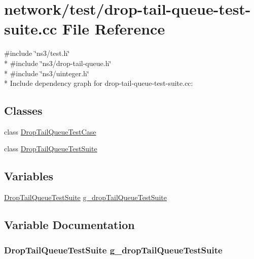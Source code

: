 \hypertarget{drop-tail-queue-test-suite_8cc}{}\section{network/test/drop-\/tail-\/queue-\/test-\/suite.cc File Reference}
\label{drop-tail-queue-test-suite_8cc}
{\ttfamily \#include \char`\"{}ns3/test.\+h\char`\"{}}\\*
{\ttfamily \#include \char`\"{}ns3/drop-\/tail-\/queue.\+h\char`\"{}}\\*
{\ttfamily \#include \char`\"{}ns3/uinteger.\+h\char`\"{}}\\*
Include dependency graph for drop-\/tail-\/queue-\/test-\/suite.cc\+:
\subsection*{Classes}
\begin{DoxyCompactItemize}
\item 
class \hyperlink{classDropTailQueueTestCase}{Drop\+Tail\+Queue\+Test\+Case}
\item 
class \hyperlink{classDropTailQueueTestSuite}{Drop\+Tail\+Queue\+Test\+Suite}
\end{DoxyCompactItemize}
\subsection*{Variables}
\begin{DoxyCompactItemize}
\item 
\hyperlink{classDropTailQueueTestSuite}{Drop\+Tail\+Queue\+Test\+Suite} \hyperlink{drop-tail-queue-test-suite_8cc_ac51a67922ad0c692e3b790cff0b2e021}{g\+\_\+drop\+Tail\+Queue\+Test\+Suite}
\end{DoxyCompactItemize}


\subsection{Variable Documentation}
\subsubsection[{\texorpdfstring{g\+\_\+drop\+Tail\+Queue\+Test\+Suite}{g_dropTailQueueTestSuite}}]{\setlength{\rightskip}{0pt plus 5cm} {\bf Drop\+Tail\+Queue\+Test\+Suite}  g\+\_\+drop\+Tail\+Queue\+Test\+Suite\hspace{0.3cm}{\ttfamily [static]}}\hypertarget{drop-tail-queue-test-suite_8cc_ac51a67922ad0c692e3b790cff0b2e021}{}\label{drop-tail-queue-test-suite_8cc_ac51a67922ad0c692e3b790cff0b2e021}
